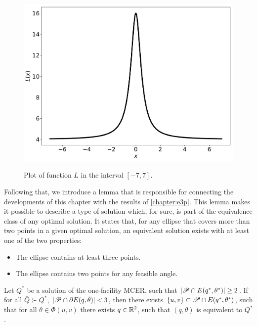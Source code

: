 \begin{figure}[H]
	\centering

	\caption{Plot of function $L$ in the interval $[-7, 7]$.}
	\includegraphics[scale=.4]{tex/figures/L-function-plot}
	\fautor
	\label{fig:L-function-plot}
\end{figure}

Following that, we introduce a lemma that is responsible for connecting the developments of this chapter with the results of \autoref{chapter:e3p}.
This lemma makes it possible to describe a type of solution which, for sure, is part of the equivalence class of any optimal solution.
It states that, for any ellipse that covers more than two points in a given optimal solution, an equivalent solution exists with at least one of the two properties:
\begin{itemize}
	\item The ellipse contains at least three points.
	\item The ellipse contains two points for any feasible angle.
\end{itemize}

\begin{lema}\label{lema:3pnts}
Let $Q^*$ be a solution of the one-facility MCER, such that $|\mathscr{P} \cap E(q^*, \theta^*)|\ge2$.
If for all $\bar{Q} \succ Q^*$, $|\mathscr{P} \cap \partial E(\bar{q}, \bar{\theta})| < 3$, then there exists $\{u, v\} \subset \mathscr{P} \cap E(q^*, \theta^*)$, such that for all $\theta\in \Phi(u,v)$ there exists $q \in \mathbb{R}^2$, such that $(q, \theta)$ is equivalent to $Q^*$.

\end{lema}


